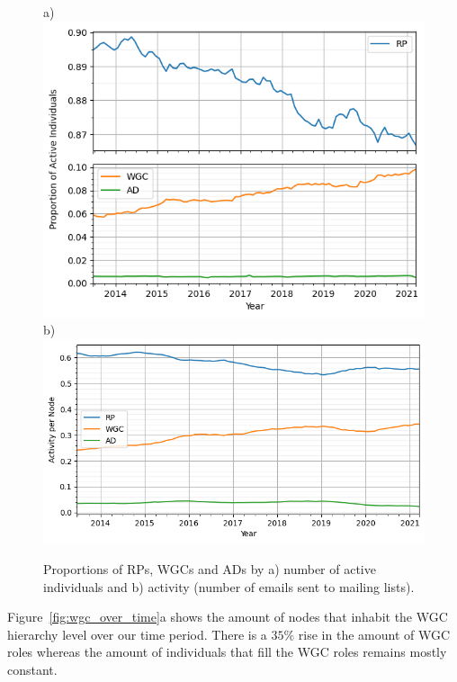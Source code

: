 \documentclass[twocolumn,10pt]{article}
\newlength{\figureWidthOneColumn}
\begin{document}
\begin{figure}[t]
  \centering
  \small{a)} \\
  \includegraphics[width=\figureWidthOneColumn]{figures-prev/icwsm-2024/active_node_proportions_year_sliding_window.png} \\
  \small{b)} \\
  \includegraphics[width=\figureWidthOneColumn]{figures-prev/icwsm-2024/activity_proportions_year_sliding_window.png}
  \caption{
    Proportions of RPs, WGCs and ADs by a) number of active individuals and
    b) activity (number of emails sent to mailing lists). 
  }
  \label{fig:activity_proportions}
\end{figure}

Figure~\ref{fig:wgc_over_time}a shows the amount of nodes that inhabit the
WGC hierarchy level over our time period. There is a $35\%$ rise in the
amount of WGC roles whereas the amount of individuals that fill the WGC
roles remains mostly constant.
\end{document}
